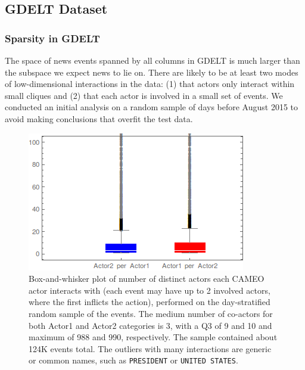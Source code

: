 
\subsection{GDELT Dataset}

\subsubsection{Sparsity in GDELT}

The space of news events spanned by all columns in GDELT is much larger than the subspace we expect news to lie on. There are likely to be at least two modes of low-dimensional interactions in the data: (1) that actors only interact within small cliques and (2) that each actor is involved in a small set of events. We conducted an initial analysis on a random sample of days before August 2015 to avoid making conclusions that overfit the test data.

\begin{figure}[ht]
\vskip 0.2in
\begin{center}
\centerline{\includegraphics[width=\columnwidth]{images/actors-per-actor.png}}
\caption{Box-and-whisker plot of number of distinct actors each CAMEO actor interacts with (each event may have up to 2 involved actors, where the first inflicts the action), performed on the day-stratified random sample of the events. The medium number of co-actors for both Actor1 and Actor2 categories is 3, with a Q3 of 9 and 10 and maximum of 988 and 990, respectively. The sample contained about 124K events total. The outliers with many interactions are generic or common names, such as \texttt{PRESIDENT} or \texttt{UNITED STATES}.
}
\end{center}
\vskip -0.2in
\label{fig:actors-per-actor}
\end{figure} 

